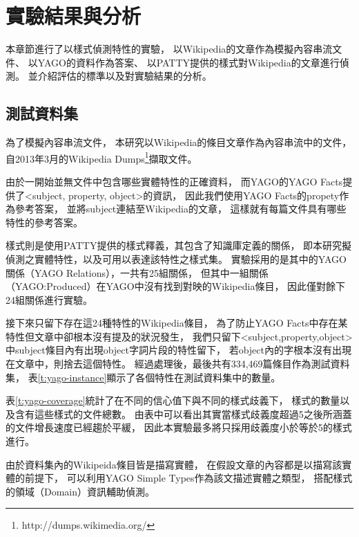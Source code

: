 %
%
%
\chapter{實驗結果與分析}
\label{c:exp}

本章節進行了以樣式偵測特性的實驗，
以Wikipedia的文章作為模擬內容串流文件、
以YAGO的資料作為答案、
以PATTY提供的樣式對Wikipedia的文章進行偵測。
並介紹評估的標準以及對實驗結果的分析。

\section{測試資料集}
\label{s:dataset}

為了模擬內容串流文件，
本研究以Wikipedia的條目文章作為內容串流中的文件，
自2013年3月的Wikipedia Dumps\footnote{http://dumps.wikimedia.org/}擷取文件。

由於一開始並無文件中包含哪些實體特性的正確資料，
而YAGO的YAGO Facts提供了<subject, property, object>的資訊，
因此我們使用YAGO Facts的propety作為參考答案，
並將subject連結至Wikipedia的文章，
這樣就有每篇文件具有哪些特性的參考答案。

樣式則是使用PATTY提供的樣式釋義，其包含了知識庫定義的關係，
即本研究擬偵測之實體特性，以及可用以表達該特性之樣式集。
實驗採用的是其中的YAGO關係（YAGO Relations），一共有25組關係，
但其中一組關係（YAGO:Produced）在YAGO中沒有找到對映的Wikipedia條目，
因此僅對餘下24組關係進行實驗。

接下來只留下存在這24種特性的Wikipedia條目，
為了防止YAGO Facts中存在某特性但文章中卻根本沒有提及的狀況發生，
我們只留下<subject,property,object>中subject條目內有出現object字詞片段的特性留下，
若object內的字根本沒有出現在文章中，則捨去這個特性。
經過處理後，最後共有334,469篇條目作為測試資料集，
表\ref{t:yago-instance}顯示了各個特性在測試資料集中的數量。



表\ref{t:yago-coverage}統計了在不同的信心值下與不同的樣式歧義下，
樣式的數量以及含有這些樣式的文件總數。
由表中可以看出其實當樣式歧義度超過5之後所涵蓋的文件增長速度已經趨於平緩，
因此本實驗最多將只採用歧義度小於等於5的樣式進行。



由於資料集內的Wikipeida條目皆是描寫實體，
在假設文章的內容都是以描寫該實體的前提下，
可以利用YAGO Simple Types作為該文描述實體之類型，
搭配樣式的領域（Domain）資訊輔助偵測。

